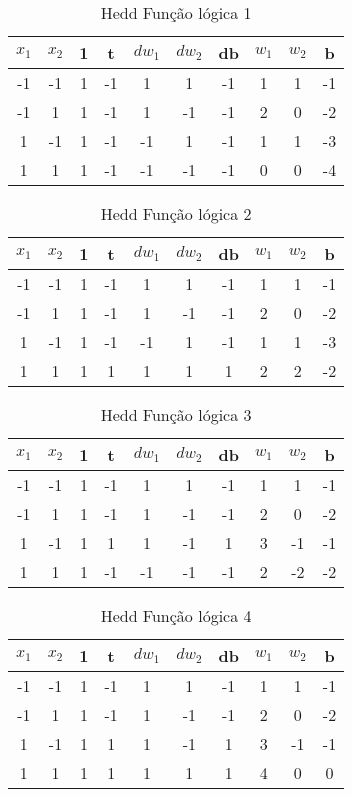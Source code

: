 \begin{table}[H]
\centering
\begin{tabular}{|c|c|c|c|c|c|c|c|c|c|}
\hline
$x_1$ & $x_2$ & 1 & t & $dw_1$ & $dw_2$ & db & $w_1$ & $w_2$ & b \\ \hline
-1 & -1 & 1 & -1 & 1 & 1 & -1 & 1 & 1 & -1\\ \hline
-1 & 1 & 1 & -1 & 1 & -1 & -1 & 2 & 0 & -2\\ \hline
1 & -1 & 1 & -1 & -1 & 1 & -1 & 1 & 1 & -3\\ \hline
1 & 1 & 1 & -1 & -1 & -1 & -1 & 0 & 0 & -4\\ \hline
\end{tabular}
\caption{Hedd Função lógica 1}\label{hedd:1}\end{table}

\begin{table}[H]
\centering
\begin{tabular}{|c|c|c|c|c|c|c|c|c|c|}
\hline
$x_1$ & $x_2$ & 1 & t & $dw_1$ & $dw_2$ & db & $w_1$ & $w_2$ & b \\ \hline
-1 & -1 & 1 & -1 & 1 & 1 & -1 & 1 & 1 & -1\\ \hline
-1 & 1 & 1 & -1 & 1 & -1 & -1 & 2 & 0 & -2\\ \hline
1 & -1 & 1 & -1 & -1 & 1 & -1 & 1 & 1 & -3\\ \hline
1 & 1 & 1 & 1 & 1 & 1 & 1 & 2 & 2 & -2\\ \hline
\end{tabular}
\caption{Hedd Função lógica 2}\label{hedd:2}\end{table}

\begin{table}[H]
\centering
\begin{tabular}{|c|c|c|c|c|c|c|c|c|c|}
\hline
$x_1$ & $x_2$ & 1 & t & $dw_1$ & $dw_2$ & db & $w_1$ & $w_2$ & b \\ \hline
-1 & -1 & 1 & -1 & 1 & 1 & -1 & 1 & 1 & -1\\ \hline
-1 & 1 & 1 & -1 & 1 & -1 & -1 & 2 & 0 & -2\\ \hline
1 & -1 & 1 & 1 & 1 & -1 & 1 & 3 & -1 & -1\\ \hline
1 & 1 & 1 & -1 & -1 & -1 & -1 & 2 & -2 & -2\\ \hline
\end{tabular}
\caption{Hedd Função lógica 3}\label{hedd:3}\end{table}

\begin{table}[H]
\centering
\begin{tabular}{|c|c|c|c|c|c|c|c|c|c|}
\hline
$x_1$ & $x_2$ & 1 & t & $dw_1$ & $dw_2$ & db & $w_1$ & $w_2$ & b \\ \hline
-1 & -1 & 1 & -1 & 1 & 1 & -1 & 1 & 1 & -1\\ \hline
-1 & 1 & 1 & -1 & 1 & -1 & -1 & 2 & 0 & -2\\ \hline
1 & -1 & 1 & 1 & 1 & -1 & 1 & 3 & -1 & -1\\ \hline
1 & 1 & 1 & 1 & 1 & 1 & 1 & 4 & 0 & 0\\ \hline
\end{tabular}
\caption{Hedd Função lógica 4}\label{hedd:4}\end{table}

